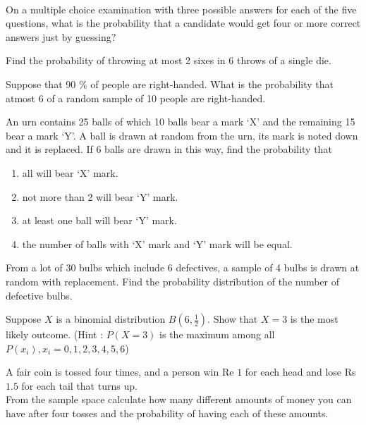 \solution\\

\item On a multiple choice examination with three possible answers for each of the five questions, what is the probability that a candidate would get four or more correct answers just by guessing$?$
\\

\item Find the probability of throwing at most 2 sixes in 6 throws of a single die.\\
\solution
\item Suppose that 90 \% of people are right-handed. What is the probability that atmost 6 of a random sample of 10 people are right-handed. 
\\
\solution

  \item An urn contains 25 balls of which 10 balls bear a mark `X' and the 
    remaining 15 bear a mark `Y'. A ball is drawn at random from the urn, its 
    mark is noted down and it is replaced. If 6 balls are drawn in this way, 
    find the probability that 
    \begin{enumerate}
        \item all will bear `X' mark. 
        \item not more than 2 will bear `Y' mark. 
        \item at least one ball will bear `Y' mark. 
        \item the number of balls with `X' mark and `Y' mark will be equal.
    \end{enumerate}
\solution

\item From a lot of 30 bulbs which include 6 defectives, a sample of 4 bulbs is drawn
at random with replacement. Find the probability distribution of the number of
defective bulbs.\\
\solution

 \item Suppose $X$ is a binomial distribution $B\left(6,\frac{1}{2}\right)$. Show that $X=3$ is the most likely outcome.
(Hint : $P(X=3)$ is the maximum among all $P(x_i),x_i=0,1,2,3,4,5,6$)\\
\solution

\item A fair coin is tossed four times, and a person win Re $1$ for each head and lose Rs $1.5$ for each tail that turns up.\\
From the sample space calculate how many different amounts of money you can have after four tosses and the probability of having each of these amounts.
